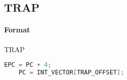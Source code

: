 \subsection{TRAP}


\paragraph{Format} TRAP

\begin{lstlisting}[language=C]
    EPC = PC + 4;
    PC = INT_VECTOR[TRAP_OFFSET];
\end{lstlisting}